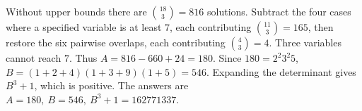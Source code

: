 Without upper bounds there are $\binom{18}{3}=816$ solutions. Subtract the four cases where a specified variable is at least $7$, each contributing $\binom{11}{3}=165$, then restore the six pairwise overlaps, each contributing $\binom43=4$. Three variables cannot reach $7$. Thus $A=816-660+24=180$. Since $180=2^2 3^2 5$, $B=(1+2+4)(1+3+9)(1+5)=546$. Expanding the determinant gives $B^3+1$, which is positive. The answers are $\boxed{A=180,\ B=546,\ B^3+1=162771337}$.
